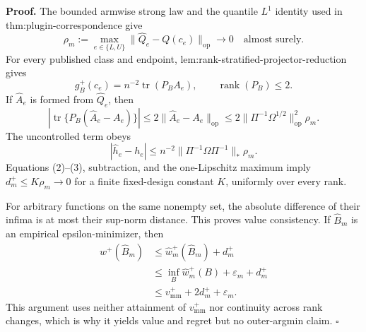 \textbf{Proof.}
The bounded armwise strong law and the quantile \(L^1\) identity used in thm:plugin-correspondence give
\[
\rho_m:=\max_{e\in\{L,U\}}\lVert\widehat Q_e-Q(c_e)\rVert_{\mathrm{op}}
\longrightarrow0
\quad\text{almost surely}.
\tag{1}
\]
For every published class and endpoint, lem:rank-stratified-projector-reduction gives
\[
g_B^+(c_e)=n^{-2}\operatorname{tr}(P_BA_e),
\qquad \operatorname{rank}(P_B)\le2.
\]
If \(\widehat A_e\) is formed from \(\widehat Q_e\), then
\[
|\operatorname{tr}\{P_B(\widehat A_e-A_e)\}|
\le2\lVert\widehat A_e-A_e\rVert_{\mathrm{op}}
\le2\lVert\Pi^{-1}\Omega^{1/2}\rVert_{\mathrm{op}}^2\rho_m.
\tag{2}
\]
The uncontrolled term obeys
\[
|\widehat h_e-h_e|
\le n^{-2}\lVert\Pi^{-1}\Omega\Pi^{-1}\rVert_*\rho_m.
\tag{3}
\]
Equations (2)--(3), subtraction, and the one-Lipschitz maximum imply \(d_m^+\le K\rho_m\to0\) for a finite fixed-design constant \(K\), uniformly over every rank.

For arbitrary functions on the same nonempty set, the absolute difference of their infima is at most their sup-norm distance.  This proves value consistency.  If \(\widehat B_m\) is an empirical epsilon-minimizer, then
\[
\begin{aligned}
w^+(\widehat B_m)
&\le\widehat w_m^+(\widehat B_m)+d_m^+\\
&\le\inf_B\widehat w_m^+(B)+\varepsilon_m+d_m^+\\
&\le v_{\mathrm{mm}}^++2d_m^++\varepsilon_m.
\end{aligned}
\]
This argument uses neither attainment of \(v_{\mathrm{mm}}^+\) nor continuity across rank changes, which is why it yields value and regret but no outer-argmin claim. \(\square\)